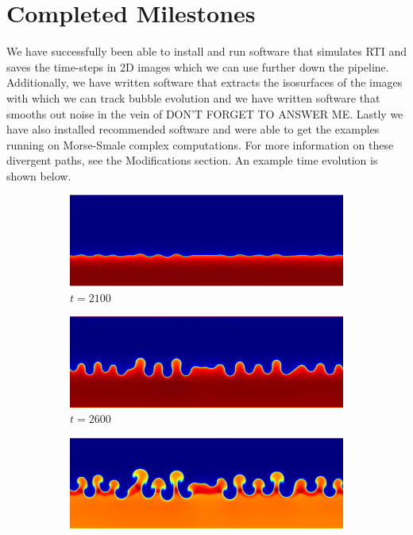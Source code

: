\documentclass[12pt, fullpage,letterpaper]{article}
\begin{document}
	\section*{\normalfont Completed Milestones} We have successfully been able to install and run software that simulates RTI and saves the time-steps in 2D images which we can use further down the pipeline. Additionally, we have written software that extracts the isosurfaces of the images with which we can track bubble evolution and we have written software that smooths out noise in the vein of DON'T FORGET TO ANSWER ME. Lastly we have also installed recommended software and were able to get the examples running on Morse-Smale complex computations. For more information on these divergent paths, see the Modifications section. An example time evolution is shown below.
		\begin{figure}[ht!]
		\centering
		\begin{subfigure}
			\centering
			\includegraphics[scale = .25]{fig1.png}
			\caption{$t = 2100$}
		\end{subfigure}
		\begin{subfigure}
			\centering
			\includegraphics[scale = .25]{fig2.png}
			\caption{$t = 2600$}
		\end{subfigure}
		\begin{subfigure}
			\centering
			\includegraphics[scale = .25]{fig3.png}

\end{subfigure}
\end{figure}
\end{document}
